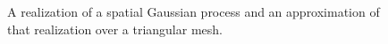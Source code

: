 \documentclass[]{interact}
\begin{document}
\begin{figure}[p]


\caption{A realization of a spatial Gaussian process and an
approximation of that realization over a triangular mesh.}
\label{surface}
\end{figure}
\end{document}
